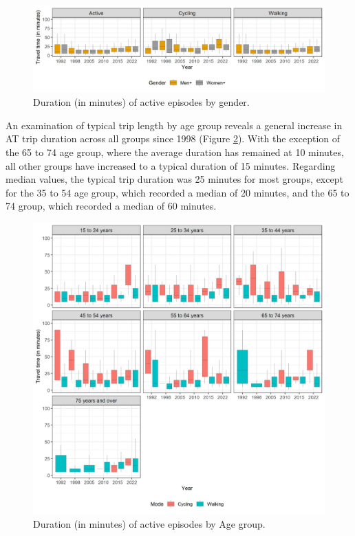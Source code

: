 \documentclass[preprint, 3p,
authoryear]{elsarticle} %
\begin{document}
\begin{figure}
\includegraphics[width=1\linewidth]{figures/gender_duration_boxplots} \caption{Duration (in minutes) of active episodes by gender.}\label{fig:gender-dur-figure}
\end{figure}

An examination of typical trip length by age group reveals a general
increase in AT trip duration across all groups since 1998 (Figure
\ref{fig:age-dur-figure}). With the exception of the 65 to 74 age group,
where the average duration has remained at 10 minutes, all other groups
have increased to a typical duration of 15 minutes. Regarding median
values, the typical trip duration was 25 minutes for most groups, except
for the 35 to 54 age group, which recorded a median of 20 minutes, and
the 65 to 74 group, which recorded a median of 60 minutes.

\begin{figure}
\includegraphics[width=1\linewidth]{figures/age_duration_boxplots} \caption{Duration (in minutes) of active episodes by Age group.}\label{fig:age-dur-figure}
\end{figure}
\end{document}
